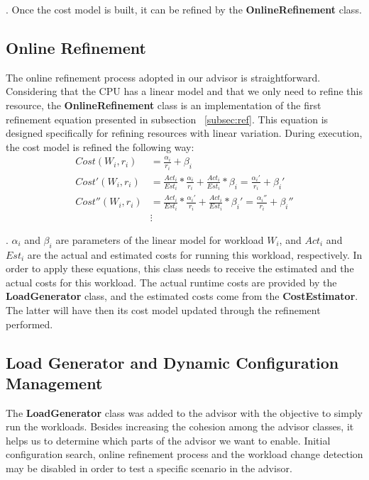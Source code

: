 . Once the cost model is built, it can be refined by the \textbf{OnlineRefinement} class.

\subsection{Online Refinement}

The online refinement process adopted in our advisor is straightforward. Considering that the CPU has a linear model and that we only need to refine this resource, the \textbf{OnlineRefinement} class  is an implementation of the first refinement equation presented in subsection ~\ref{subsec:ref}. This equation is designed specifically for refining resources with linear variation. During execution, the cost model is refined the following way:
\begin{equation}
 \begin{split}
   Cost(W_{i}, r_{i}) & = \frac{\alpha_{i}}{r_{i}} +\beta_{i} \\
   Cost'(W_{i}, r_{i}) & = \frac{Act_{i}}{Est_{i}} * \frac{\alpha_{i}}{r_{i}} + \frac{Act_{i}}{Est_{i}} * \beta_{i} = \frac{\alpha_{i}'}{r_{i}} +\beta_{i}' \\
   Cost''(W_{i}, r_{i}) & = \frac{Act_{i}}{Est_{i}} * \frac{\alpha_{i}'}{r_{i}} + \frac{Act_{i}}{Est_{i}} * \beta_{i}' = \frac{\alpha_{i}''}{r_{i}} +\beta_{i}'' \\
    & \vdots
 \end{split}
\end{equation}

 . $\alpha_{i}$ and $\beta_{i}$ are parameters of the linear model for workload $W_{i}$, and $Act_{i}$ and $Est_{i}$ are the actual and estimated costs for running this workload, respectively. In order to apply these equations, this class needs to receive the estimated and the actual costs for this workload. The actual runtime costs are provided by the \textbf{LoadGenerator} class, and the estimated costs come from the \textbf{CostEstimator}. The latter will have then its cost model updated through the refinement performed.

\subsection{Load Generator and Dynamic Configuration Management}

The \textbf{LoadGenerator} class was added to the advisor with the objective to simply run the workloads. Besides increasing the cohesion among the advisor classes, it helps us to determine which parts of the advisor we want to enable. Initial configuration search, online refinement process and the workload change detection may be disabled in order to test a specific scenario in the advisor.

